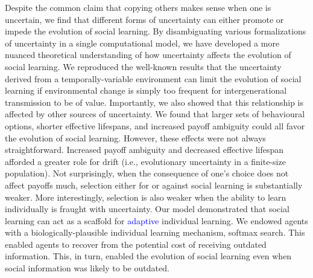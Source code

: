 \documentclass[letterpaper,11.5pt]{scrartcl}
\newcommand{\cm}[1]{{\textcolor{mypurple} {({\tiny CM:} #1)}}}
\newcommand{\edit}[1]{{\textcolor{blue} {#1}}}
\begin{document}
 Despite the common claim that copying others makes sense when one is uncertain, we find that different forms of uncertainty can
 either promote or impede the evolution of social learning. By disambiguating various formalizations of uncertainty in a single
 computational model, we have developed a more nuanced theoretical understanding of how uncertainty affects the evolution of social learning. %
We reproduced the well-known results that the uncertainty derived from a temporally-variable environment can limit the evolution of social learning if environmental change is simply too frequent for intergenerational transmission to be of value. Importantly, we also showed that this relationship is affected by other sources of uncertainty. 
We found that larger sets of behavioural options, shorter effective lifespans,
and increased payoff ambiguity could all favor the evolution of social learning.
However, these effects were not always straightforward. Increased payoff
ambiguity and decreased effective lifespan afforded a greater role for drift
(i.e., evolutionary uncertainty in a finite-size population). Not surprisingly,
when the consequence of one's choice does not affect payoffs much, selection
either for or against social learning is substantially weaker. More
interestingly, selection is also weaker when the ability to learn individually
is fraught with uncertainty. Our model demonstrated that social learning can act
as a scaffold for \edit{adaptive} individual learning. We endowed agents with a
biologically-plausible individual learning mechanism, softmax search. This
enabled agents to recover from the potential cost of receiving outdated
information. This, in turn, enabled the evolution of social learning even when
social information was likely to be outdated. 

\end{document}
